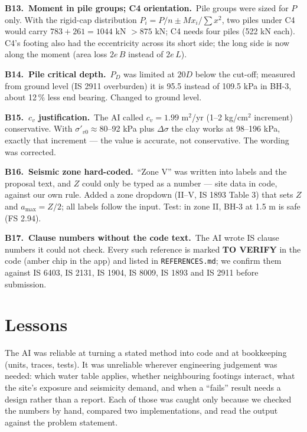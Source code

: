 \documentclass[11pt,a4paper]{article}
\newcommand{\code}[1]{\texttt{\small #1}}
\newcommand{\auditem}[3]{\par\medskip\textbf{\color{accent}#1.\ #2.}\ #3\par}
\begin{document}
\auditem{B13}{Moment in pile groups; C4 orientation}{Pile groups were sized for $P$ only. With the rigid-cap
distribution $P_i = P/n \pm M x_i/\sum x^2$, two piles under C4 would carry $783 + 261 = 1044$ kN $> 875$ kN; C4 needs
four piles (522 kN each). C4's footing also had the eccentricity across its short side; the long side is now along the
moment (area loss $2e\,B$ instead of $2e\,L$).}

\auditem{B14}{Pile critical depth}{$P_D$ was limited at $20D$ below the cut-off; measured from ground level (IS 2911
overburden) it is 95.5 instead of 109.5 kPa in BH-3, about 12\,\% less end bearing. Changed to ground level.}

\auditem{B15}{$c_v$ justification}{The AI called $c_v = 1.99$ m$^2$/yr (1--2 kg/cm$^2$ increment) conservative. With
$\sigma'_{v0} \approx 80$--92 kPa plus $\Delta\sigma$ the clay works at 98--196 kPa, exactly that increment --- the
value is accurate, not conservative. The wording was corrected.}

\auditem{B16}{Seismic zone hard-coded}{``Zone V'' was written into labels and the proposal text, and $Z$ could only be
typed as a number --- site data in code, against our own rule. Added a zone dropdown (II--V, IS 1893 Table 3) that sets
$Z$ and $a_\text{max} = Z/2$; all labels follow the input. Test: in zone II, BH-3 at 1.5 m is safe (FS 2.94).}

\auditem{B17}{Clause numbers without the code text}{The AI wrote IS clause numbers it could not check. Every such
reference is marked \textbf{TO VERIFY} in the code (amber chip in the app) and listed in \code{REFERENCES.md}; we
confirm them against IS 6403, IS 2131, IS 1904, IS 8009, IS 1893 and IS 2911 before submission.}

\section{Lessons}
The AI was reliable at turning a stated method into code and at bookkeeping (units, traces, tests). It was unreliable
wherever engineering judgement was needed: which water table applies, whether neighbouring footings interact, what the
site's exposure and seismicity demand, and when a ``fails'' result needs a design rather than a report. Each of those
was caught only because we checked the numbers by hand, compared two implementations, and read the output against the
problem statement.
\end{document}
